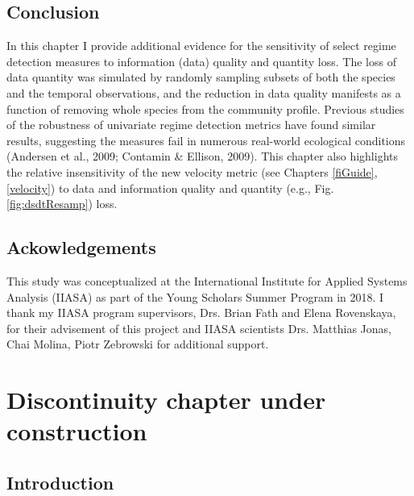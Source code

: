 \documentclass[12pt,twoside,openany]{reedthesis}
\begin{document}
\hypertarget{conclusion}{%
\section{Conclusion}\label{conclusion}}

In this chapter I provide additional evidence for the sensitivity of select regime detection measures to information (data) quality and quantity loss. The loss of data quantity was simulated by randomly sampling subsets of both the species and the temporal observations, and the reduction in data quality manifests as a function of removing whole species from the community profile. Previous studies of the robustness of univariate regime detection metrics have found similar results, suggesting the measures fail in numerous real-world ecological conditions (Andersen et al., 2009; Contamin \& Ellison, 2009). This chapter also highlights the relative insensitivity of the new velocity metric (see Chapters \ref{fiGuide}, \ref{velocity}) to data and information quality and quantity (e.g., Fig. \ref{fig:dsdtResamp}) loss.

\hypertarget{ackowledgements}{%
\section{Ackowledgements}\label{ackowledgements}}

This study was conceptualized at the International Institute for Applied Systems Analysis (IIASA) as part of the Young Scholars Summer Program in 2018. I thank my IIASA program supervisors, Drs. Brian Fath and Elena Rovenskaya, for their advisement of this project and IIASA scientists Drs. Matthias Jonas, Chai Molina, Piotr Zebrowski for additional support.

\hypertarget{discontinuity}{%
\chapter{Discontinuity chapter under construction}\label{discontinuity}}

\hypertarget{introduction-5}{%
\section{Introduction}\label{introduction-5}}
\end{document}
